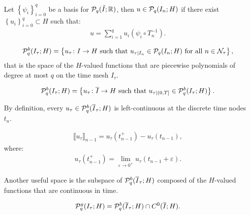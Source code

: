 Let $\left\{ \psi_i \right\}_{i = 0}^q$ be a basis for $\mathcal{P}_{q}(\hat{I}; \mathbb{R})$, then $u \in \mathcal{P}_{q}(I_n; H)$ if there exist $\left\{ u_i \right\}_{i = 0}^q \subset H$ such that:
\begin{gather}
    u = \sum_{i = 1}^q u_i (\psi_i \circ T_n^{-1}).
\end{gather}

\begin{definition}[$\Pk{q}^b(I_{\tau}; H)$]
    \begin{gather}
        \mathcal{P}_{q}^b(I_{\tau}; H) = \left\{ u_{\tau} \colon I \rightarrow H \text{ such that } u_{\tau \mid I_n} \in \mathcal{P}_{q}(I_n; H) \text{ for all } n \in \mathcal{N}_{\tau} \right\},
    \end{gather}
    that is the space of the $H$-valued functions that are piecewise polynomials of degree at most $q$ on the time mesh $I_{\tau}$.
\end{definition}

\begin{definition}
    \begin{gather}
        \mathcal{P}_{q}^b(I_{\tau}; H) = \left\{ u_{\tau} \colon \overline{I} \rightarrow H \text{ such that } u_{\tau \mid (0, T]} \in \mathcal{P}_{q}^b(I_{\tau}; H) \right\}.
    \end{gather}
\end{definition}


By definition, every $u_{\tau} \in \mathcal{P}_{q}^b(\overline{I}_{\tau}; H)$ is left-continuous at the discrete time nodes $t_n$.

\begin{definition}
    \begin{gather}
        \llbracket u_{\tau} \rrbracket_{n - 1} = u_{\tau}(t_{n - 1}^+) - u_{\tau}(t_{n - 1}),
    \end{gather}
    where:
    \begin{gather}
        u_{\tau}(t_{n - 1}^+) = \lim_{\varepsilon \rightarrow 0^+} u_{\tau}(t_{n - 1} + \varepsilon).
    \end{gather}
\end{definition}

Another useful space is the subspace of $\mathcal{P}_{q}^b(\overline{I}_{\tau}; H)$ composed of the $H$-valued functions that are continuous in time.

\begin{definition}
    \begin{gather}
        \mathcal{P}_{q}^g(I_{\tau}; H) = \mathcal{P}_{q}^b(\overline{I}_{\tau}; H) \cap C^0(\overline{I}; H).
    \end{gather}
\end{definition}

